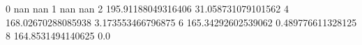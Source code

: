0 nan nan
1 nan nan
2 195.91188049316406 31.058731079101562
4 168.02670288085938 3.173553466796875
6 165.34292602539062 0.489776611328125
8 164.8531494140625 0.0
